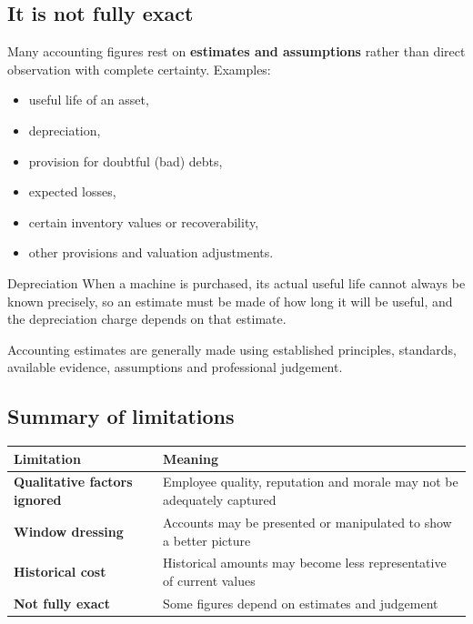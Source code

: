 \documentclass[11pt,a4paper]{article}
\begin{document}
\subsection{It is not fully exact}

Many accounting figures rest on \textbf{estimates and assumptions} rather than direct observation
with complete certainty. Examples:

\begin{itemize}
  \item useful life of an asset,
  \item depreciation,
  \item provision for doubtful (bad) debts,
  \item expected losses,
  \item certain inventory values or recoverability,
  \item other provisions and valuation adjustments.
\end{itemize}

\begin{exbox}{Depreciation}
When a machine is purchased, its actual useful life cannot always be known precisely, so an estimate
must be made of how long it will be useful, and the depreciation charge depends on that estimate.
\end{exbox}

\begin{impbox}
Accounting estimates are generally made using established principles, standards, available evidence,
assumptions and professional judgement.
\end{impbox}

\subsection{Summary of limitations}

\begin{center}
\small
\begin{tabularx}{\textwidth}{@{}l Y@{}}
\toprule
{}\textbf{Limitation} & \textbf{Meaning}\\
\midrule
\textbf{Qualitative factors ignored} & Employee quality, reputation and morale may not be adequately captured\\
\textbf{Window dressing} & Accounts may be presented or manipulated to show a better picture\\
\textbf{Historical cost} & Historical amounts may become less representative of current values\\
\textbf{Not fully exact} & Some figures depend on estimates and judgement\\
\bottomrule
\end{tabularx}
\end{center}
\end{document}
